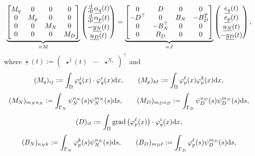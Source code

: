 \documentclass[letterpaper,10pt,english]{sphinxmanual}
\begin{document}
\begin{equation*}
\begin{split}\underbrace{\begin{bmatrix}
M_q & 0 & 0 & 0 \\
0 & M_p & 0 & 0 \\
0 & 0 & M_N & 0 \\
0 & 0 & 0 & M_D
\end{bmatrix}}_{= M}
\begin{pmatrix}
\frac{\rm d}{{\rm d}t} \underline{\alpha_q}(t) \\
\frac{\rm d}{{\rm d}t} \underline{\alpha_p}(t) \\
-\underline{y_N}(t) \\
\underline{u_D}(t)
\end{pmatrix}
=
\underbrace{\begin{bmatrix}
0 & D & 0 & 0 \\
-D^\top & 0 & B_N & -B_D^T \\
0 & -B_N^\top & 0 & 0 \\
0 & B_D & 0 & 0
\end{bmatrix}}_{= J}
\begin{pmatrix}
\underline{e_q}(t) \\
\underline{e_p}(t) \\
\underline{u_N}(t) \\
-\underline{y_D}(t)
\end{pmatrix},\end{split}
\end{equation*}
\sphinxAtStartPar
where
\(\underline{\star}(t) := \begin{pmatrix} \star^1(t) & \cdots & \star^{N_\star} \end{pmatrix}^\top\)
and
\begin{equation}\label{equation:examples/wave:weak-form-matrices-1}
\begin{split}   (M_q)_{ij} := \int_\Omega \varphi_q^j(x) \cdot \varphi_q^i(x) {\rm d}x,
   \qquad
   (M_p)_{k\ell} := \int_\Omega \varphi_p^\ell(x) \varphi_p^k(x) {\rm d}x,\end{split}
\end{equation}\begin{equation}\label{equation:examples/wave:weak-form-matrices-2}
\begin{split}   (M_N)_{m_Nn_N} := \int_{\Gamma_N} \psi_N^{n_N}(s) \psi_N^{m_N}(s) {\rm d}s,
   \qquad
   (M_D)_{m_Dn_D} := \int_{\Gamma_D} \psi_D^{n_D}(s) \psi_D^{m_D}(s) {\rm d}s,\end{split}
\end{equation}\begin{equation*}
\begin{split}(D)_{i\ell} := \int_\Omega {\rm grad} \left( \varphi_p^\ell(x) \right) \cdot \varphi_q^i(x) {\rm d}x,\end{split}
\end{equation*}\begin{equation*}
\begin{split}(B_N)_{n_Nk} := \int_{\Gamma_N} \varphi_p^k(s) \psi_N^{n_N}(s) {\rm d}s,
\qquad
(B_D)_{m_D\ell} := \int_{\Gamma_D} \varphi_p^\ell(s) \psi_D^{m_D}(s) {\rm d}s,\end{split}
\end{equation*}
\end{document}
